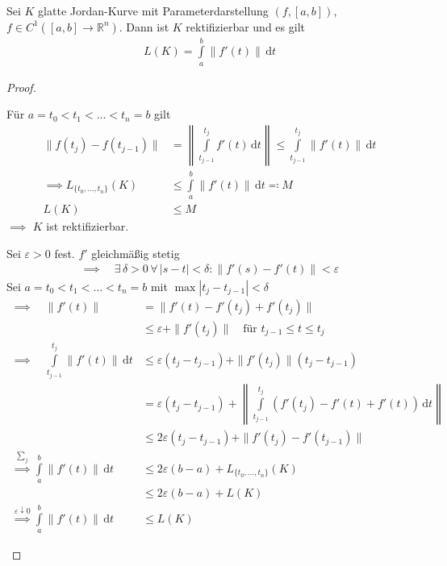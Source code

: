 \begin{theorem}[Satz] \label{thm:6.11}
  Sei $K$ glatte Jordan-Kurve mit Parameterdarstellung $(f,[a,b])$, $f \in C^1([a,b] \to \mathbb{R}^n)$. Dann ist $K$ rektifizierbar und es gilt
  \begin{align*}
    L(K) = \int\limits_{a}^{b} \|f'(t)\| \, \mathrm{d}t
  \end{align*}
  
  \begin{proof}
    \begin{enum-arab}
      \item Für $a=t_0 < t_1 < \ldots < t_n=b$ gilt
      \begin{align*}
        \|f(t_j) - f(t_{j-1})\|
        &= \left\| \int\limits_{t_{j-1}}^{t_j} f'(t) \, \mathrm{d}t \right\|
        \leq \int\limits_{t_{j-1}}^{t_j} \|f'(t)\| \, \mathrm{d}t \\
        \implies L_{\{t_0,\ldots,t_n\}}(K)
        &\leq \int\limits_{a}^{b} \|f'(t)\| \, \mathrm{d}t \eqcolon M \\
        L(K) &\leq M
      \end{align*}
      $\implies$ $K$ ist rektifizierbar.
      
      \item Sei $\varepsilon > 0$ fest. $f'$ gleichmäßig stetig
      \begin{align*}
        \implies \quad \exists \, \delta > 0 \, \forall \, |s-t| < \delta : \|f'(s) - f'(t)\| < \varepsilon
      \end{align*}
      Sei $a=t_0 < t_1 < \ldots < t_n=b$ mit $\max|t_j - t_{j-1}| < \delta$
      \begin{align*}
        \implies \quad \|f'(t)\|
        &= \|f'(t) - f'(t_j) + f'(t_j)\| \\
        &\leq \varepsilon + \|f'(t_j)\| \quad \text{für } t_{j-1} \leq t \leq t_j \\
        \implies \quad \int\limits_{t_{j-1}}^{t_j} \|f'(t)\| \, \mathrm{d}t
        &\leq \varepsilon (t_j - t_{j-1}) + \|f'(t_j)\| (t_j - t_{j-1}) \\
        &= \varepsilon (t_j - t_{j-1}) + \left\| \int\limits_{t_{j-1}}^{t_j} \left( f'(t_j) - f'(t) + f'(t) \right) \, \mathrm{d}t \right\| \\
        &\leq 2 \varepsilon (t_j - t_{j-1}) + \|f'(t_j) - f'(t_{j-1})\| \\
        \overset{\sum_j}{\implies} \int\limits_{a}^{b} \|f'(t)\| \, \mathrm{d}t
        &\leq 2 \varepsilon (b-a) + L_{\{t_0,\ldots,t_n\}} (K) \\
        &\leq 2 \varepsilon (b-a) + L (K) \\
        \overset{\varepsilon \downarrow 0}{\implies} \int\limits_{a}^{b} \|f'(t)\| \, \mathrm{d}t &\leq L(K)
      \end{align*}
    \end{enum-arab}
  \end{proof}
\end{theorem}

